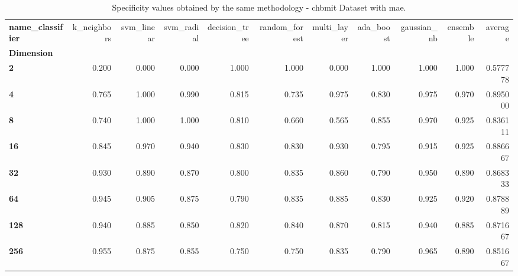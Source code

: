 \begin{table}
\centering
\caption{Specificity values obtained by the same methodology - chbmit Dataset with mae.}
\label{specificity_chbmit_mae-reproduction}
\begin{tabular}{lrrrrrrrrrr}
\toprule
\textbf{name\_classifier} &  k\_neighbors &  svm\_linear &  svm\_radial &  decision\_tree &  random\_forest &  multi\_layer &  ada\_boost &  gaussian\_nb &  ensemble &   average \\
\textbf{Dimension} &              &             &             &                &                &              &            &              &           &           \\
\midrule
\textbf{2        } &        0.200 &       0.000 &       0.000 &          1.000 &          1.000 &        0.000 &      1.000 &        1.000 &     1.000 &  0.577778 \\
\textbf{4        } &        0.765 &       1.000 &       0.990 &          0.815 &          0.735 &        0.975 &      0.830 &        0.975 &     0.970 &  0.895000 \\
\textbf{8        } &        0.740 &       1.000 &       1.000 &          0.810 &          0.660 &        0.565 &      0.855 &        0.970 &     0.925 &  0.836111 \\
\textbf{16       } &        0.845 &       0.970 &       0.940 &          0.830 &          0.830 &        0.930 &      0.795 &        0.915 &     0.925 &  0.886667 \\
\textbf{32       } &        0.930 &       0.890 &       0.870 &          0.800 &          0.835 &        0.860 &      0.790 &        0.950 &     0.890 &  0.868333 \\
\textbf{64       } &        0.945 &       0.905 &       0.875 &          0.790 &          0.835 &        0.885 &      0.830 &        0.925 &     0.920 &  0.878889 \\
\textbf{128      } &        0.940 &       0.885 &       0.850 &          0.820 &          0.840 &        0.870 &      0.815 &        0.940 &     0.885 &  0.871667 \\
\textbf{256      } &        0.955 &       0.875 &       0.855 &          0.750 &          0.750 &        0.835 &      0.790 &        0.965 &     0.890 &  0.851667 \\
\bottomrule
\end{tabular}
\end{table}

